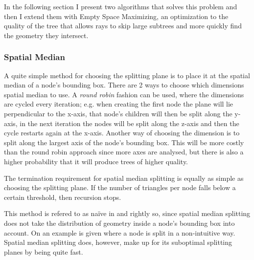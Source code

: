 In the following section I present two algorithms that solves this problem and
then I extend them with Empty Space Maximizing, an optimization to the quality
of the tree that allows rays to skip large subtrees and more quickly find the
geometry they intersect.


\subsubsection{Spatial Median}



A quite simple method for choosing the splitting plane is to place it at the
spatial median of a node's bounding box. There are 2 ways to choose which
dimensions spatial median to use. A \textit{round robin} fashion can be used,
where the dimensions are cycled every iteration; e.g. when creating the first
node the plane will lie perpendicular to the x-axis, that node's children will
then be split along the y-axis, in the next iteration the nodes will be split
along the z-axis and then the cycle restarts again at the x-axis. Another way of
choosing the dimension is to split along the largest axis of the node's bounding
box. This will be more costly than the round robin approach since more axes are
analysed, but there is also a higher probability that it will produce trees of
higher quality.

The termination requirement for spatial median splitting is equally as simple as
choosing the splitting plane. If the number of triangles per node falls below a
certain threshold, then recursion stops.


This method is refered to as naïve in  and rightly so,
since spatial median splitting does not take the distribution of geometry inside
a node's bounding box into account. On  an example is
given where a node is split in a non-intuitive way. Spatial median splitting
does, however, make up for its suboptimal splitting planes by being quite fast.


